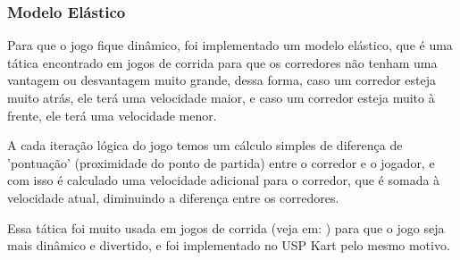 \subsubsection{Modelo Elástico}

Para que o jogo fique dinâmico, foi implementado um modelo elástico, que é uma tática encontrado em jogos de corrida para que os corredores não tenham uma vantagem ou desvantagem muito grande, dessa forma, caso um corredor esteja muito atrás, ele terá uma velocidade maior, e caso um corredor esteja muito à frente, ele terá uma velocidade menor.

A cada iteração lógica do jogo temos um cálculo simples de diferença de 'pontuação' (proximidade do ponto de partida) entre o corredor e o jogador, e com isso é calculado uma velocidade adicional para o corredor, que é somada à velocidade atual, diminuindo a diferença entre os corredores.

Essa tática foi muito usada em jogos de corrida (veja em: \cite{rubberBandAi}) para que o jogo seja mais dinâmico e divertido, e foi implementado no USP Kart pelo mesmo motivo.